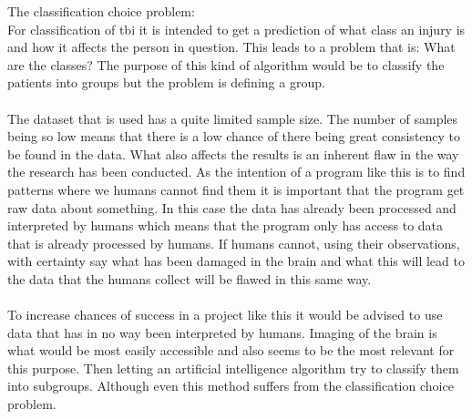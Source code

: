 \documentclass[11pt]{article}
\begin{document}
The classification choice problem:\\
For classification of \gls{tbi} it is intended to get a prediction of what class an injury is and how it affects the person in question. This leads to a problem that is: What are the classes? The purpose of this kind of algorithm would be to classify the patients into groups but the problem is defining a group.\\
\\
The dataset that is used has a quite limited sample size. The number of samples being so low means that there is a low chance of there being great consistency to be found in the data. What also affects the results is an inherent flaw in the way the research has been conducted. As the intention of a program like this is to find patterns where we humans cannot find them it is important that the program get raw data about something. In this case the data has already been processed and interpreted by humans which means that the program only has access to data that is already processed by humans. If humans cannot, using their observations, with certainty say what has been damaged in the brain and what this will lead to the data that the humans collect will be flawed in this same way.\\
\\
To increase chances of success in a project like this it would be advised to use data that has in no way been interpreted by humans. Imaging of the brain is what would be most easily accessible and also seems to be the most relevant for this purpose. Then letting an artificial intelligence algorithm try to classify them into subgroups. Although even this method suffers from the classification choice problem.
\end{document}
